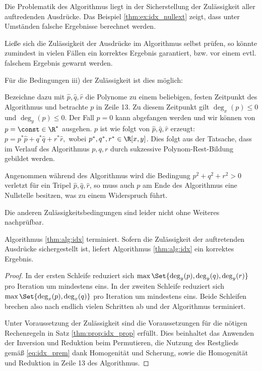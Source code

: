 \documentclass{mythesis}
\begin{document}
\begin{remark} \label{thm:rem:idx_badcases}
    Die Problematik des Algorithmus liegt in der Sicherstellung der Zulässigkeit aller auftredenden Ausdrücke.
    Das Beispiel \ref{thm:ex:idx_nullext} zeigt, dass unter Umständen falsche Ergebnisse berechnet werden.

    Ließe sich die Zulässigkeit der Ausdrücke im Algorithmus selbst prüfen, so könnte zumindest in vielen Fällen ein korrektes Ergebnis garantiert, bzw. vor einem evtl. falschem Ergebnis gewarnt werden.

    Für die Bedingungen iii) der Zulässigkeit ist dies möglich:

    Bezeichne dazu mit $\hat p, \hat q, \hat r$ die Polynome zu einem beliebigen, festen Zeitpunkt des Algorithmus und betrachte $p$ in Zeile 13.
    Zu diesem Zeitpunkt gilt $\deg_x(p) \le 0$ und $\deg_y(p) \le 0$.
    Der Fall $p = 0$ kann abgefangen werden und wir können von $p = \const \in \R^*$ ausgehen.
    $p$ ist wie folgt von $\hat p, \hat q, \hat r$ erzeugt:
    \begin{math}[numbered] \label{eq:prem_repr}
        p = p^* \hat p + q^* \hat q + r^* \hat r,
    \end{math}
    wobei $p^*, q^*, r^* \in \R[x,y]$.
    Dies folgt aus der Tatsache, dass im Verlauf des Algorithmus $p, q, r$ durch sukzessive Polynom-Rest-Bildung gebildet werden.

    Angenommen während des Algorithmus wird die Bedingung $p^2 + q^2 + r^2 > 0$ verletzt für ein Tripel $\hat p, \hat q, \hat r$, so muss auch $p$ am Ende des Algorithmus eine Nullstelle besitzen, was zu einem Widerspruch führt.

    Die anderen Zulässigkeitsbedingungen sind leider nicht ohne Weiteres nachprüfbar.
\end{remark}

\begin{proposition}
    Algorithmus \ref{thm:alg:idx} terminiert.
    Sofern die Zulässigkeit der auftretenden Ausdrücke sichergestellt ist, liefert Algorithmus \ref{thm:alg:idx} ein korrektes Ergebnis.
    \begin{proof}
        In der ersten Schleife reduziert sich $\max\Set{\deg_y(p), \deg_y(q), \deg_y(r)}$ pro Iteration um mindestens eins.
        In der zweiten Schleife reduziert sich $\max\Set{\deg_x(p), \deg_x(q)}$ pro Iteration um mindestens eins.
        Beide Schleifen brechen also nach endlich vielen Schritten ab und der Algorithmus terminiert.

        Unter Voraussetzung der Zulässigkeit sind die Voraussetzungen für die nötigen Rechenregeln in Satz \ref{thm:prop:idx_prop} erfüllt.
        Dies beinhaltet das Anwenden der Inversion und Reduktion beim Permutieren, die Nutzung des Restglieds gemäß \eqref{eq:idx_prem} dank Homogenität und Scherung, sowie die Homogenität und Reduktion in Zeile 13 des Algorithmus.
    \end{proof}
\end{proposition}
\end{document}
